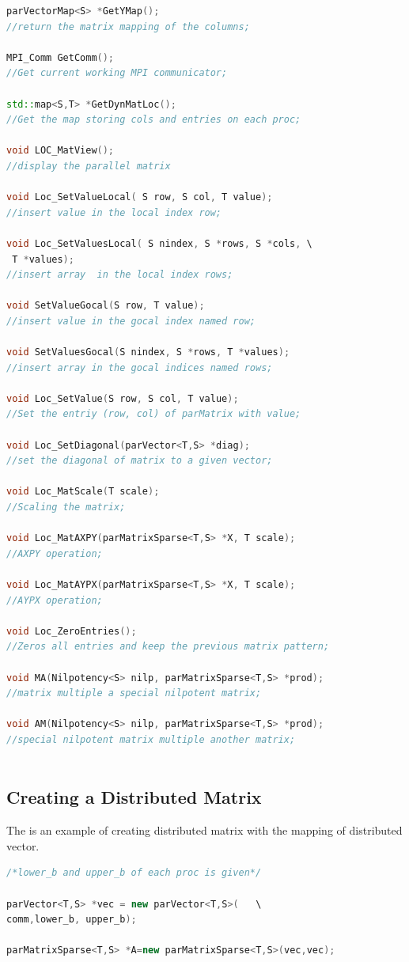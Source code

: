 \documentclass[a4paper, 10 pt]{report}
\begin{document}
	\begin{lstlisting}[language=C++,frame=single]
parVectorMap<S> *GetYMap();
//return the matrix mapping of the columns;
	
MPI_Comm GetComm();
//Get current working MPI communicator;
	
std::map<S,T> *GetDynMatLoc();
//Get the map storing cols and entries on each proc;
	
void LOC_MatView();
//display the parallel matrix
	
void Loc_SetValueLocal( S row, S col, T value);
//insert value in the local index row;
	
void Loc_SetValuesLocal( S nindex, S *rows, S *cols, \
 T *values);
//insert array  in the local index rows;
	
void SetValueGocal(S row, T value);
//insert value in the gocal index named row;
	
void SetValuesGocal(S nindex, S *rows, T *values);
//insert array in the gocal indices named rows;
	
void Loc_SetValue(S row, S col, T value);
//Set the entriy (row, col) of parMatrix with value;
	
void Loc_SetDiagonal(parVector<T,S> *diag);
//set the diagonal of matrix to a given vector;
	
void Loc_MatScale(T scale);
//Scaling the matrix;
	
void Loc_MatAXPY(parMatrixSparse<T,S> *X, T scale);
//AXPY operation;
	
void Loc_MatAYPX(parMatrixSparse<T,S> *X, T scale);
//AYPX operation;
	
void Loc_ZeroEntries();
//Zeros all entries and keep the previous matrix pattern;
	
void MA(Nilpotency<S> nilp, parMatrixSparse<T,S> *prod);
//matrix multiple a special nilpotent matrix;
	
void AM(Nilpotency<S> nilp, parMatrixSparse<T,S> *prod);
//special nilpotent matrix multiple another matrix;
	
	\end{lstlisting}
	
	\subsection{Creating a Distributed Matrix}
	
	The is an example of creating distributed matrix with the mapping of distributed vector.
	
	\begin{lstlisting}[language=C++,frame=single]
/*lower_b and upper_b of each proc is given*/

parVector<T,S> *vec = new parVector<T,S>(   \
comm,lower_b, upper_b);

parMatrixSparse<T,S> *A=new parMatrixSparse<T,S>(vec,vec);
	\end{lstlisting}
	
\end{document}
